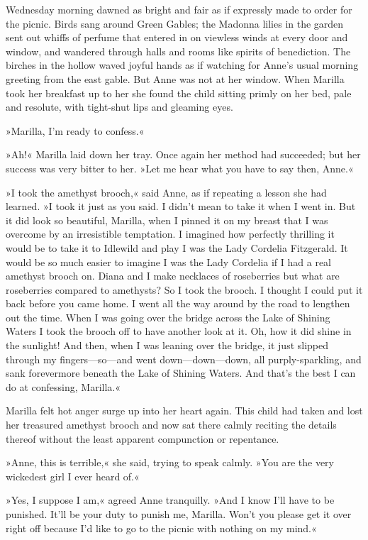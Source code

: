 Wednesday morning dawned as bright and fair as if expressly made to order for the picnic. Birds sang around Green Gables; the Madonna lilies in the garden sent out whiffs of perfume that entered in on viewless winds at every door and window, and wandered through halls and rooms like spirits of benediction. The birches in the hollow waved joyful hands as if watching for Anne's usual morning greeting from the east gable. But Anne was not at her window. When Marilla took her breakfast up to her she found the child sitting primly on her bed, pale and resolute, with tight-shut lips and gleaming eyes.

»Marilla, I'm ready to confess.«

»Ah!« Marilla laid down her tray. Once again her method had succeeded; but her success was very bitter to her. »Let me hear what you have to say then, Anne.«

»I took the amethyst brooch,« said Anne, as if repeating a lesson she had learned. »I took it just as you said. I didn't mean to take it when I went in. But it did look so beautiful, Marilla, when I pinned it on my breast that I was overcome by an irresistible temptation. I imagined how perfectly thrilling it would be to take it to Idlewild and play I was the Lady Cordelia Fitzgerald. It would be so much easier to imagine I was the Lady Cordelia if I had a real amethyst brooch on. Diana and I make necklaces of roseberries but what are roseberries compared to amethysts? So I took the brooch. I thought I could put it back before you came home. I went all the way around by the road to lengthen out the time. When I was going over the bridge across the Lake of Shining Waters I took the brooch off to have another look at it. Oh, how it did shine in the sunlight! And then, when I was leaning over the bridge, it just slipped through my fingers—so—and went down—down—down, all purply-sparkling, and sank forevermore beneath the Lake of Shining Waters. And that's the best I can do at confessing, Marilla.«

Marilla felt hot anger surge up into her heart again. This child had taken and lost her treasured amethyst brooch and now sat there calmly reciting the details thereof without the least apparent compunction or repentance.

»Anne, this is terrible,« she said, trying to speak calmly. »You are the very wickedest girl I ever heard of.«

»Yes, I suppose I am,« agreed Anne tranquilly. »And I know I'll have to be punished. It'll be your duty to punish me, Marilla. Won't you please get it over right off because I'd like to go to the picnic with nothing on my mind.«

